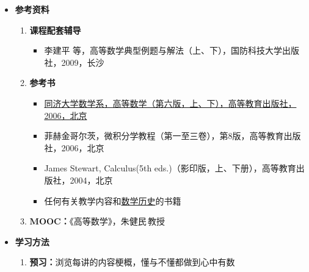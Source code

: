 \begin{itemize}
	\item {\bf 参考资料}
  	\begin{enumerate}
		\item {\bf 课程配套辅导}
	  	\begin{itemize}
	    	\item {李建平 等，高等数学典型例题与解法（上、下），国防科技大学出版社，2009，长沙} 
	  	\end{itemize}
  		\item {\bf 参考书} 
  		\begin{itemize}
	    	\item \underline{同济大学数学系，高等数学（第六版，上、下），高等教育出版社，2006，北京} 
	    	\item 菲赫金哥尔茨，微积分学教程（第一至三卷），第8版，高等教育出版社，2006，北京 
	    	\item James Stewart, Calculus(5th eds.)（影印版，上、下册），高等教育出版社，2004，北京
	    	\item 任何有关教学内容和\underline{数学历史}的书籍
  		\end{itemize}
  		\item {\bf MOOC：}《高等数学》，朱健民\,教授
	\end{enumerate}
	\item {\bf 学习方法}
	\begin{enumerate}
	  \item {\bf 预习：}浏览每讲的内容梗概，懂与不懂都做到心中有数

\end{enumerate}
\end{itemize}
